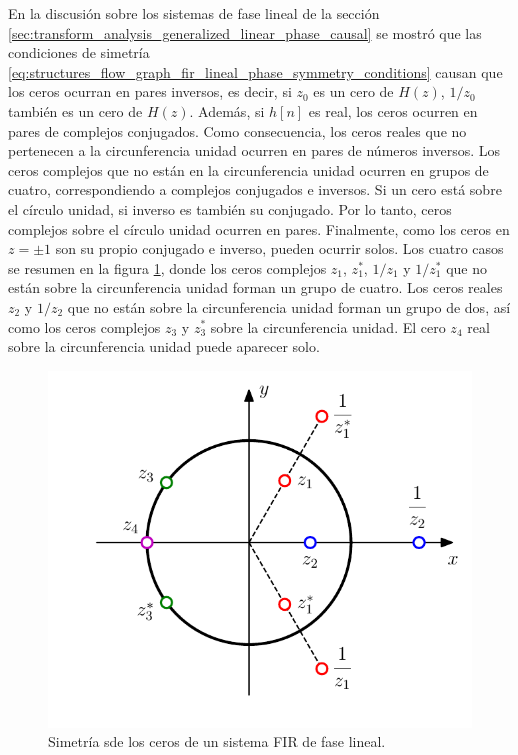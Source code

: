 \documentclass[a4paper]{report}
\begin{document}
En la discusión sobre los sistemas de fase lineal de la sección \ref{sec:transform_analysis_generalized_linear_phase_causal} se mostró que las condiciones de simetría \ref{eq:structures_flow_graph_fir_lineal_phase_symmetry_conditions} causan que los ceros ocurran en pares inversos, es decir, si \(z_0\) es un cero de \(H(z)\), \(1/z_0\) también es un cero de \(H(z)\). Además, si \(h[n]\) es real, los ceros ocurren en pares de complejos conjugados. Como consecuencia, los ceros reales que no pertenecen a la circunferencia unidad ocurren en pares de números inversos. Los ceros complejos que no están en la circunferencia unidad ocurren en grupos de cuatro, correspondiendo a complejos conjugados e inversos. Si un cero está sobre el círculo unidad, si inverso es también su conjugado. Por lo tanto, ceros complejos sobre el círculo unidad ocurren en pares. Finalmente, como los ceros en \(z=\pm1\) son su propio conjugado e inverso, pueden ocurrir solos. Los cuatro casos se resumen en la figura \ref{fig:structures_flow_graph_lineal_phase_FIR_zeros}, donde los ceros complejos \(z_1\), \(z^*_1\), \(1/z_1\) y \(1/z^*_1\) que no están sobre la circunferencia unidad forman un grupo de cuatro. Los ceros reales \(z_2\) y \(1/z_2\) que no están sobre la circunferencia unidad forman un grupo de dos, así como los ceros complejos \(z_3\) y \(z^*_3\) sobre la circunferencia unidad. El cero \(z_4\) real sobre la circunferencia unidad puede aparecer solo. 
\begin{figure}[!htb]
 \begin{minipage}[c]{0.49\textwidth}
  \includegraphics[width=\textwidth]{figuras/structures_flow_graph_lineal_phase_FIR_zeros.pdf}
 \end{minipage}\hfill
 \begin{minipage}[c]{0.41\textwidth}
  \caption{
     Simetría sde los ceros de un sistema FIR de fase lineal.
  }\label{fig:structures_flow_graph_lineal_phase_FIR_zeros}
 \end{minipage}
\end{figure}
\end{document}
